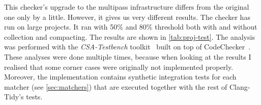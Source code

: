 This checker's upgrade to the multipass infrastructure differs from the original one only by a little. However,
it gives us very different results. The checker has run on large projects. It ran with 50\% and 80\% threshold both with and
without collection and compacting. The results are shown in \cref{tab:proj-test}.
The analysis was performed with the \emph{CSA-Testbench} toolkit~\cite{Horvath_Kovacs_Szecsi_2020} built on top of CodeChecker~\cite{codechecker}.
These analyses were done multiple times, because when looking at the results I realised that some corner cases were originally not implemented properly.
Moreover, the implementation contains synthetic integration tests for each matcher (see \cref{sec:matchers}) that are executed together with the rest of Clang-Tidy's tests.

